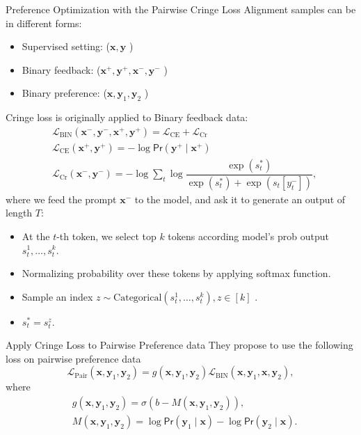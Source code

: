 \documentclass[10pt,xcolor={usenames,dvipsnames,table},aspectratio=169]{beamer}
\begin{document}
\begin{frame}{Preference Optimization with the Pairwise Cringe Loss}
    Alignment samples can be in different forms:
    \begin{itemize}
        \item Supervised setting: ($\bm{x}, \bm{y}$ )
        \item Binary feedback: ($\bm{x}^{+}, \bm{y}^{+}, \bm{x}^{-}, \bm{y}^{-}$ )
        \item Binary preference: ($\bm{x}, \bm{y}_1, \bm{y}_2$ )
    \end{itemize}
\end{frame}

\begin{frame}
    Cringe loss is originally applied to Binary feedback data:
    \begin{align*}
    &\mathcal{L}_{\text{BIN}}(\bm{x}^{-}, \bm{y}^{-}, \bm{x}^{+}, \bm{y}^{+}) = \mathcal{L}_{\text{CE}} + \mathcal{L}_{\text{Cr}} \\
    &\mathcal{L}_{\text{CE}}(\bm{x}^{+}, \bm{y}^{+}) = -\log \textsf{Pr}(\bm{y}^{+} \mid \bm{x}^{+}) \\
    &\mathcal{L}_{\text{Cr}}(\bm{x}^{-}, \bm{y}^{-}) = -\log \sum_{t} \log \dfrac{\exp(s_t^{*})}{\exp(s_t^{*}) + \exp(s_t[y_t^{-}])},
    \end{align*}
    where we feed the prompt $\bm{x}^{-}$ to the model, and ask it to generate an output of length $T$:
    \begin{itemize}
        \item At the $t$-th token, we select top $k$ tokens according model's prob output $s_t^{1}, \ldots , s_t^{k}$.
        \item Normalizing probability over these tokens by applying softmax function.
        \item Sample an index $z \sim \text{Categorical}(s_t^{1}, \ldots , s_t^{k}), z \in [k]$ .
        \item $s_t^{*} = s_t^{z}$.
    \end{itemize}
\end{frame}
\begin{frame}{Apply Cringe Loss to Pairwise Preference data}
    They propose to use the following loss on pairwise preference data
    \[
    \mathcal{L}_{\text{Pair}}(\bm{x}, \bm{y}_1, \bm{y}_2) = g(\bm{x}, \bm{y}_1, \bm{y}_2) \mathcal{L}_{\text{BIN}}(\bm{x}, \bm{y}_1, \bm{x}, \bm{y}_2),
    \] 
    where 
    \begin{align*}
    &g(\bm{x}, \bm{y}_1, \bm{y}_2) = \sigma (b - M(\bm{x}, \bm{y}_1, \bm{y}_2)),\\
    &M(\bm{x}, \bm{y}_1, \bm{y}_2) = \log \textsf{Pr}(\bm{y}_1 \mid \bm{x}) - \log \textsf{Pr}(\bm{y}_2 \mid \bm{x}).
    \end{align*}
\end{frame}
\end{document}
